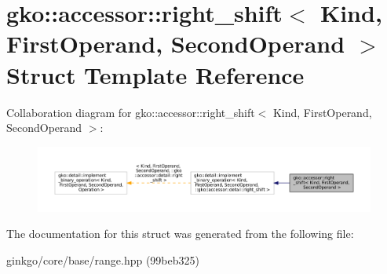 \hypertarget{structgko_1_1accessor_1_1right__shift}{}\section{gko\+:\+:accessor\+:\+:right\+\_\+shift$<$ Kind, First\+Operand, Second\+Operand $>$ Struct Template Reference}
\label{structgko_1_1accessor_1_1right__shift}


Collaboration diagram for gko\+:\+:accessor\+:\+:right\+\_\+shift$<$ Kind, First\+Operand, Second\+Operand $>$\+:
\nopagebreak
\begin{figure}[H]
\begin{center}
\leavevmode
\includegraphics[width=350pt]{structgko_1_1accessor_1_1right__shift__coll__graph}
\end{center}
\end{figure}


The documentation for this struct was generated from the following file\+:\begin{DoxyCompactItemize}
\item 
ginkgo/core/base/range.\+hpp (99beb325)\end{DoxyCompactItemize}
